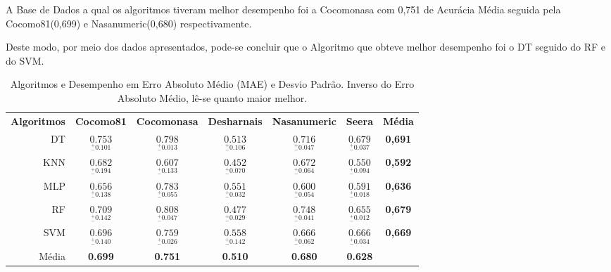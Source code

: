 \documentclass[12pt]{article}
\begin{document}
A Base de Dados a qual os algoritmos tiveram melhor desempenho foi a Cocomonasa com 0,751 de Acurácia Média seguida pela Cocomo81(0,699) e  Nasanumeric(0,680) respectivamente.

Deste modo, por meio dos dados apresentados, pode-se concluir que o Algoritmo que obteve melhor desempenho foi o DT seguido do RF e do SVM.

\begin{table}[h!]
  \begin{center}
    \caption{Algoritmos e Desempenho em Erro Absoluto Médio (MAE) e Desvio Padrão. Inverso do Erro Absoluto Médio, lê-se quanto maior melhor. }
    \label{tab_desempenho}
    \begin{tabular}{r|c|c|c|c|c|c}
      \textbf{Algoritmos} & \textbf{Cocomo81}                              & \textbf{Cocomonasa}                            & \textbf{Desharnais}                            & \textbf{Nasanumeric}                            & \textbf{Seera}                                  & \textbf{Média } \\
      DT                  & \( \underset{_{-}^{+}\textrm{0.101}}{0.753} \) & \( \underset{_{-}^{+}\textrm{0.013}}{0.798} \) & \( \underset{_{-}^{+}\textrm{0.106}}{0.513} \) & \( \underset{_{-}^{+}\textrm{0.047}}{0.716} \)  & \( \underset{_{-}^{+}\textrm{0.037}}{0.679} \)  & \textbf{0,691}  \\ \hline
      KNN                 & \( \underset{_{-}^{+}\textrm{0.194}}{0.682} \) & \( \underset{_{-}^{+}\textrm{0.133}}{0.607} \) & \( \underset{_{-}^{+}\textrm{0.070}}{0.452} \) & \( \underset{_{-}^{+}\textrm{0.064}}{0.672} \)  & \( \underset{_{-}^{+}\textrm{0.094}}{0.550 } \) & \textbf{0,592}  \\ \hline
      MLP                 & \( \underset{_{-}^{+}\textrm{0.138}}{0.656} \) & \( \underset{_{-}^{+}\textrm{0.055}}{0.783} \) & \( \underset{_{-}^{+}\textrm{0.032}}{0.551} \) & \( \underset{_{-}^{+}\textrm{0.054}}{0.600} \)  & \( \underset{_{-}^{+}\textrm{0.018}}{0.591} \)  & \textbf{0,636}  \\ \hline
      RF                  & \( \underset{_{-}^{+}\textrm{0.142}}{0.709} \) & \( \underset{_{-}^{+}\textrm{0.047}}{0.808} \) & \( \underset{_{-}^{+}\textrm{0.029}}{0.477} \) & \( \underset{_{-}^{+}\textrm{0.041}}{0.748} \)  & \( \underset{_{-}^{+}\textrm{0.012}}{0.655} \)  & \textbf{0,679}  \\ \hline
      SVM                 & \( \underset{_{-}^{+}\textrm{0.140}}{0.696} \) & \( \underset{_{-}^{+}\textrm{0.026}}{0.759} \) & \( \underset{_{-}^{+}\textrm{0.142}}{0.558} \) & \( \underset{_{-}^{+}\textrm{0.062}}{0.666 } \) & \( \underset{_{-}^{+}\textrm{0.034}}{0.666} \)  & \textbf{0,669}  \\ \hline
      Média               & \textbf{0.699}                                 & \textbf{0.751}                                 & \textbf{0.510}                                 & \textbf{0.680}                                  & \textbf{0.628}                                  &                 \\ \hline
    \end{tabular}
  \end{center}
\end{table}
\end{document}

